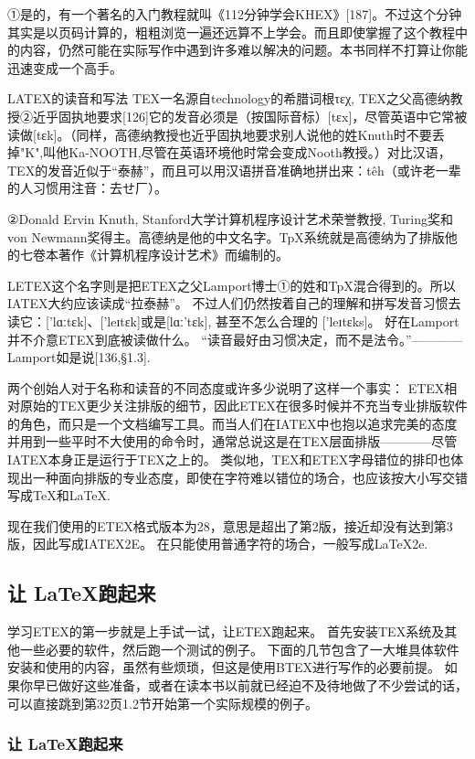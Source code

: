 \documentclass[UTF8]{ctexart}
\begin{document}
①是的，有一个著名的入门教程就叫《112分钟学会KHEX》[187]。不过这个分钟其实是以页码计算的，粗粗浏览一遍还远算不上学会。而且即使掌握了这个教程中的内容，仍然可能在实际写作中遇到许多难以解决的问题。本书同样不打算让你能迅速变成一个高手。

LATEX的读音和写法
TEX一名源自technology的希腊词根τεχ, TEX之父高德纳教授②近乎固执地要求[126]它的发音必须是（按国际音标）[tεx]，尽管英语中它常被读做[tεk]。（同样，高德纳教授也近乎固执地要求别人说他的姓Knuth时不要丢掉"K",叫他Ka-NOOTH,尽管在英语环境他时常会变成Nooth教授。）对比汉语，TEX的发音近似于“泰赫”，而且可以用汉语拼音准确地拼出来：têh（或许老一辈的人习惯用注音：去せ厂）。

②Donald Ervin Knuth, Stanford大学计算机程序设计艺术荣誉教授, Turing奖和von Newmann奖得主。高德纳是他的中文名字。TpX系统就是高德纳为了排版他的七卷本著作《计算机程序设计艺术》而编制的。

LETEX这个名字则是把ETEX之父Lamport博士①的姓和TpX混合得到的。所以IATEX大约应该读成“拉泰赫”。
不过人们仍然按着自己的理解和拼写发音习惯去读它：['lɑːtεk]、['leɪtεk]或是[lɑː'tεk], 甚至不怎么合理的 ['leɪtεks]。
好在Lamport并不介意ETEX到底被读做什么。
“读音最好由习惯决定，而不是法令。”————Lamport如是说[136,§1.3].

两个创始人对于名称和读音的不同态度或许多少说明了这样一个事实：
ETEX相对原始的TEX更少关注排版的细节，因此ETEX在很多时候并不充当专业排版软件的角色，而只是一个文档编写工具。而当人们在IATEX中也抱以追求完美的态度并用到一些平时不大使用的命令时，通常总说这是在TEX层面排版————尽管IATEX本身正是运行于TEX之上的。
类似地，TEX和ETEX字母错位的排印也体现出一种面向排版的专业态度，即使在字符难以错位的场合，也应该按大小写交错写成TeX和LaTeX.

现在我们使用的ETEX格式版本为28，意思是超出了第2版，接近却没有达到第3版，因此写成IATEX2E。
在只能使用普通字符的场合，一般写成LaTeX2e.

\subsection{让 \LaTeX 跑起来}%
\label{sub:让LaTeX跑起来}

学习ETEX的第一步就是上手试一试，让ETEX跑起来。
首先安装TEX系统及其他一些必要的软件，然后跑一个测试的例子。
下面的几节包含了一大堆具体软件安装和使用的内容，虽然有些烦琐，但这是使用BTEX进行写作的必要前提。
如果你早已做好这些准备，或者在读本书以前就已经迫不及待地做了不少尝试的话，可以直接跳到第32页1.2节开始第一个实际规模的例子。

\subsubsection{让 \LaTeX 跑起来}%
\label{sub:让LaTeX跑起来}
\end{document}
